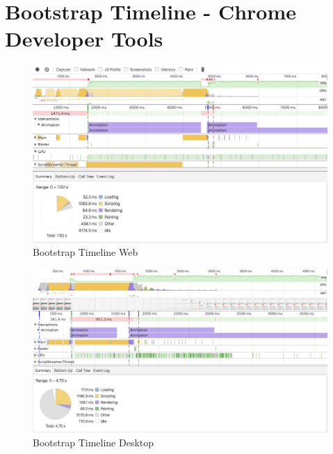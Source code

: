 \newpage

\section{Bootstrap Timeline - Chrome Developer Tools}
\label{profiling}

\begin{figure}[h!p]
 \centering
 \includegraphics[width=0.9\linewidth]{appendix/profile-web.png}
 \caption{Bootstrap Timeline Web}
 \label{bootstrap-web}
\end{figure}

\begin{figure}[h!p]
 \centering
 \includegraphics[width=0.9\linewidth]{appendix/profile-electron.png}
 \caption{Bootstrap Timeline Desktop}
  \label{bootstrap-desktop}
\end{figure}
